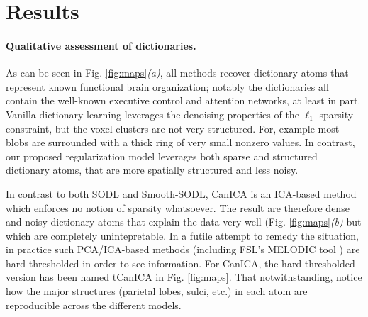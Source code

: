 \section{Results}
\label{sec:results}
\paragraph{Qualitative assessment of dictionaries.}
As can be seen in Fig. \ref{fig:maps}\textit{(a)}, all methods recover
dictionary atoms that represent known functional brain organization;
notably the dictionaries all
contain the well-known executive control and attention networks, at least
in part. Vanilla dictionary-learning leverages the denoising properties
of the $\ell_1$ sparsity constraint, but the voxel clusters are not very structured. For, example most blobs are surrounded with a thick ring of very small nonzero values.  In contrast, our proposed regularization model leverages both sparse and structured dictionary atoms, that are more spatially structured and less noisy.

In contrast to both SODL and Smooth-SODL, CanICA  \cite{varoquaux2010group} is an ICA-based method which enforces no notion of sparsity whatsoever. The result are therefore dense and noisy dictionary atoms that explain the data very well (Fig. \ref{fig:maps}\textit{(b)} but which are completely unintepretable. In a futile attempt to remedy the situation, in practice such PCA/ICA-based methods (including FSL's MELODIC tool  \cite{smith2004advances}) are hard-thresholded in order to see information. For CanICA, the hard-thresholded version has been named tCanICA in Fig. \ref{fig:maps}.
That notwithstanding, notice how the major structures (parietal lobes, sulci, etc.) in each atom are reproducible across the different models.

